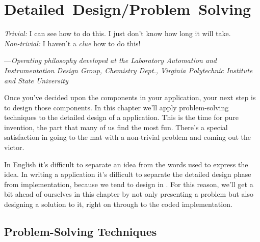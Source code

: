 
\chapter{Detailed~Design/\allowhyphens Problem~Solving}

%
%
%
\begin{tfquot}
\emph{Trivial:} I can see how to do this. I just don't know how long it
will take.\\
\emph{Non-trivial:} I haven't a \emph{clue} how to do this!

\begin{flushright}
---\emph{Operating philosophy developed at the Laboratory
Automation and Instrumentation Design Group,
Chemistry Dept., Virginia Polytechnic Institute and State University}
\end{flushright}
\end{tfquot}
Once you've decided upon the components in your application, your next
step is to design those components. In this chapter we'll apply
problem-solving techniques to the detailed design of a \Forth{} application.
This is the time for pure invention, the part that many of us find the most
fun. There's a special satisfaction in going to the mat with a non-trivial
problem and coming out the victor.

In English it's difficult to separate an idea from the words used to
express the idea. In writing a \Forth{} application it's difficult to
separate the detailed design phase from implementation, because we tend
to design in \Forth{}. For this reason, we'll get a bit ahead of ourselves in
this chapter by not only presenting a problem but also designing a solution
to it, right on through to the coded implementation.

\section{Problem-Solving Techniques}%
%

